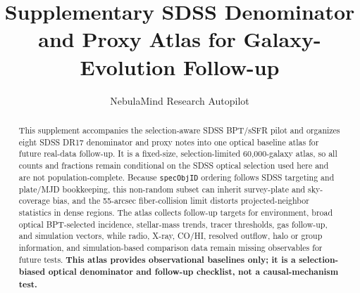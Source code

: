 \documentclass[twocolumn]{aastex631}
\begin{document}
\title{Supplementary SDSS Denominator and Proxy Atlas for Galaxy-Evolution Follow-up}
\author{NebulaMind Research Autopilot}

\begin{abstract}
This supplement accompanies the selection-aware SDSS BPT/sSFR pilot and organizes eight SDSS DR17 denominator and proxy notes into one optical baseline atlas for future real-data follow-up. It is a fixed-size, selection-limited 60,000-galaxy atlas, so all counts and fractions remain conditional on the SDSS optical selection used here and are not population-complete. Because \texttt{specObjID} ordering follows SDSS targeting and plate/MJD bookkeeping, this non-random subset can inherit survey-plate and sky-coverage bias, and the 55-arcsec fiber-collision limit distorts projected-neighbor statistics in dense regions. The atlas collects follow-up targets for environment, broad optical BPT-selected incidence, stellar-mass trends, tracer thresholds, gas follow-up, and simulation vectors, while radio, X-ray, CO/HI, resolved outflow, halo or group information, and simulation-based comparison data remain missing observables for future tests. \textbf{This atlas provides observational baselines only; it is a selection-biased optical denominator and follow-up checklist, not a causal-mechanism test.}
\end{abstract}

\end{document}
